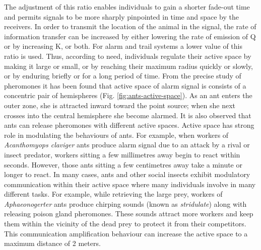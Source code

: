 \documentclass{intech}
\begin{document}
The adjustment of this ratio enables individuals to gain a shorter fade-out time and permits signals to be more sharply pinpointed in time and space by the receivers. In order to transmit the location of the animal in the signal, the rate of information transfer can be increased by either lowering the rate of emission of Q or by increasing K, or both. For alarm and trail systems a lower value of this ratio is used. Thus, according to need, individuals regulate their active space by making it large or small, or by reaching their maximum radius quickly or slowly, or by enduring briefly or for a long period of time. From the precise study of pheromones it has been found that active space of alarm signal is consists of a concentric pair of hemispheres (Fig. \ref{fig:ants-active-space}). As an ant enters the outer zone, she is attracted inward toward the point source; when she next crosses into the central hemisphere she become alarmed. It is also observed that ants can release pheromones with different active spaces.
Active space has strong role in modulating the behaviours of ants. For example, when workers of {\em Acanthomyops claviger} ants produce alarm signal due to an attack by a rival or insect predator, workers sitting a few millimetres away begin to react within seconds. However, those ants sitting a few centimetres away take a minute or longer to react. In many cases, ants and other social insects exhibit modulatory communication within their active space where many individuals involve in many different tasks. For example, while retrieving the large prey, workers of {\em Aphaeonogerter} ants produce chirping sounds (known as \textit{stridulate}) along with releasing poison gland pheromones. These sounds attract more workers and keep them within the vicinity of the dead prey to protect it from their competitors. This communication amplification behaviour can increase the active space to a maximum distance of 2 meters.
\end{document}
